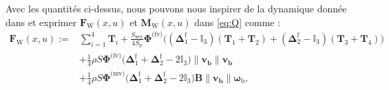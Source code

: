 Avec les quantités ci-dessus, nous pouvons nous inspirer de la dynamique donnée dans  \cite[eqns (97),~(98)]{lustosaHal-03035938} et exprimer $\boldsymbol{F}_{\text{W}}(x,u)$ et $\boldsymbol{M}_{\text{W}}(x,u)$ dans \eqref{eq:Q} comme :
\begingroup
    \allowdisplaybreaks
    \begin{align}
    \nonumber
    \boldsymbol{F}_{\text{W}}(x,u) :={}&  \sum_{i=1}^{4} \boldsymbol{T}_{i} + \frac{S_{\text{wet}}}{4S_{\text{p}}} \boldsymbol{\Phi}^{\text{(fv)}} \Big( (\boldsymbol{\Delta}^{\text{f}}_1 - \mathbb{I}_{3} ) (\boldsymbol{T}_{1}+\boldsymbol{T}_{2}) + ( \boldsymbol{\Delta}^{\text{f}}_2 - \mathbb{I}_{3}) (\boldsymbol{T}_{3}+\boldsymbol{T}_{4})\Big) \\ 
    \nonumber
        &+ \frac{1}{4} \rho S  \boldsymbol{\Phi}^{\text{(fv)}} \Big(\boldsymbol{\Delta}^{\text{f}}_1+ \boldsymbol{\Delta}^{\text{f}}_2 - 2 \mathbb{I}_{3} \Big) \lVert \boldsymbol{v_{\text{b}}} \rVert \boldsymbol{v_{\text{b}}}\\
        &+ \frac{1}{4} \rho S \boldsymbol{\Phi}^{\text{(mv)}} \Big(\boldsymbol{\Delta}^{\text{f}}_1 + \boldsymbol{\Delta}^{\text{f}}_2 - 2\mathbb{I}_{3}\Big) \boldsymbol{B} \lVert \boldsymbol{v_{\text{b}}} \rVert  \boldsymbol{\omega}_{\text{b}}, \label{eq:FbColibri}
    \end{align}
\endgroup
\begingroup
    \allowdisplaybreaks
